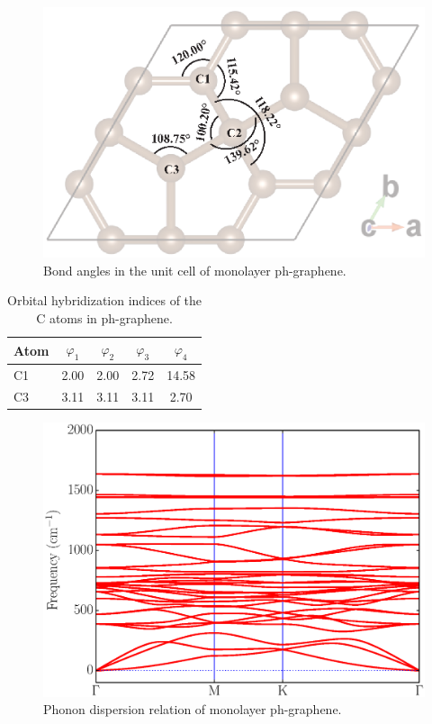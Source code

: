 \begin{figure}[htb]
\centering
\includegraphics[width=0.7\linewidth]{PG_bond-angle.eps}%
\caption{  Bond angles in the unit cell of monolayer ph-graphene. \label{angle}}
\end{figure}
  
\begin{table}[htb]
\centering
\caption{Orbital hybridization indices of the C atoms in ph-graphene. \label{hybrid}}
\begin{tabular}{lcccc}
\hline\hline
Atom & $\varphi_1$ & $\varphi_2$ & $\varphi_3$ & $\varphi_4$  \\ \hline
C1 & 2.00 & 2.00 & 2.72 & 14.58 \\
C3 & 3.11 & 3.11 & 3.11 & 2.70 \\
\hline\hline
\end{tabular}
\end{table}

\begin{figure}[htb]
\centering
\includegraphics[width=0.7\linewidth]{PG_phonon.eps}%
\caption{  Phonon dispersion relation of monolayer ph-graphene. \label{phonon}}
\end{figure}

